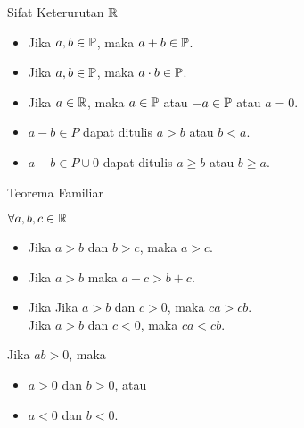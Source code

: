 \documentclass{beamer}
\begin{document}
\begin{frame}{Sifat Keterurutan $\R$}
    \begin{tcolorbox}[enhanced,title=Bilangan Positif $\P$, frame style tile={width=\paperwidth}{\wallpaper}]
        \begin{itemize}
            \item Jika $a,b \in \P$, maka $a+b \in \P$.
            \item Jika $a,b \in \P$, maka $a\cdot b \in \P$.
            \item Jika $a \in \R$, maka $a \in \P$ atau $-a \in \P$ atau $a=0$.
        \end{itemize}
    \end{tcolorbox}
    \begin{tcolorbox}[enhanced,title=Definisi 2.1.6, frame style tile={width=\paperwidth}{\wallpaper}]
        \begin{itemize}
            \item $a-b \in P$ dapat ditulis $a > b$ atau $b < a$.
            \item $a-b \in P \cup {0}$ dapat ditulis $a \geq b$ atau $b \geq a$.
        \end{itemize}
    \end{tcolorbox}
\end{frame}

\begin{frame}{Teorema Familiar}
    \begin{tcolorbox}[enhanced,title=Teorema 2.1.7, frame style tile={width=\paperwidth}{\wallpaper}]
        $\forall a,b,c \in \R$
        \begin{itemize}
            \item Jika $a > b$ dan $b > c$, maka $a > c$.
            \item Jika $a > b$ maka $a+c > b+c$.
            \item Jika Jika $a > b$ dan $c > 0$, maka $ca > cb$.\\
            Jika $a > b$ dan $c < 0$, maka $ca < cb$.
        \end{itemize}
    \end{tcolorbox}
    \begin{tcolorbox}[enhanced,title=Teorema 2.1.10, frame style tile={width=\paperwidth}{\wallpaper}]
        Jika $ab > 0$, maka
        \begin{itemize}
            \item $a > 0$ dan $b > 0$, atau
            \item $a < 0$ dan $b < 0$.
        \end{itemize}
    \end{tcolorbox}
\end{frame}
\end{document}
